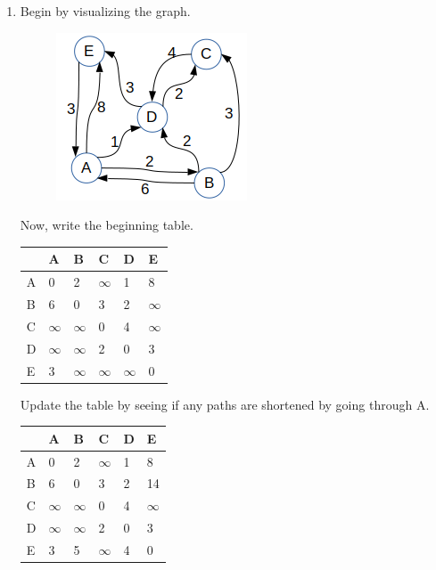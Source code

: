 \documentclass{article}
\begin{document}
\begin{enumerate}
\noindent\rule{8cm}{0.4pt}

\item 
Begin by visualizing the graph. 

\begin{figure}[H]
	\includegraphics[]{P4/graph}
\end{figure}

Now, write the beginning table. 
\begin{table}[H]
\begin{tabular}{|l|l|l|l|l|l|}
\hline
 & A & B & C & D & E \\ \hline
A & 0 & 2 & $\infty$ & 1 & 8 \\ \hline
B & 6 & 0 & 3 & 2 & $\infty$ \\ \hline
C & $\infty$ & $\infty$ & 0 & 4 & $\infty$ \\ \hline
D & $\infty$ & $\infty$ & 2 & 0 & 3 \\ \hline
E & 3 & $\infty$ & $\infty$ & $\infty$ & 0 \\ \hline
\end{tabular}
\end{table}

Update the table by seeing if any paths are shortened by going through A. 

\begin{table}[H]
\begin{tabular}{|l|l|l|l|l|l|}
\hline
 & A & B & C & D & E \\ \hline
A & 0 & 2 & $\infty$ & 1 & 8 \\ \hline
B & 6 & 0 & 3 & 2 & 14 \\ \hline
C & $\infty$ & $\infty$ & 0 & 4 & $\infty$ \\ \hline
D & $\infty$ & $\infty$ & 2 & 0 & 3 \\ \hline
E & 3 & 5 & $\infty$ & 4 & 0 \\ \hline
\end{tabular}
\end{table}


\end{enumerate}
\end{document}
